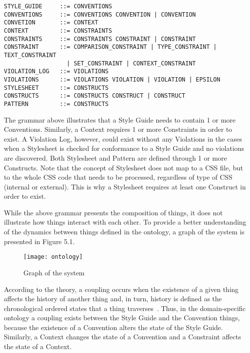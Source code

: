 \documentclass[parskip=full]{uvamscse}
\begin{document}
\begin{snippet}
\begin{verbatim}
STYLE_GUIDE     ::= CONVENTIONS
CONVENTIONS     ::= CONVENTIONS CONVENTION | CONVENTION 
CONVETION       ::= CONTEXT
CONTEXT         ::= CONSTRAINTS
CONSTRAINTS     ::= CONSTRAINTS CONSTRAINT | CONSTRAINT
CONSTRAINT      ::= COMPARISON_CONSTRAINT | TYPE_CONSTRAINT | TEXT_CONSTRAINT 
                  | SET_CONSTRAINT | CONTEXT_CONSTRAINT 
VIOLATION_LOG   ::= VIOLATIONS
VIOLATIONS      ::= VIOLATIONS VIOLATION | VIOLATION | EPSILON
STYLESHEET      ::= CONSTRUCTS
CONSTRUCTS      ::= CONSTRUCTS CONSTRUCT | CONSTRUCT
PATTERN         ::= CONSTRUCTS
\end{verbatim}
\end{snippet}

The grammar above illustrates that a Style Guide needs to contain 1 or more Conventions. Similarly,
a Context requires 1 or more Constraints in order to exist. A Violation Log, however, could exist
without any Violations in the cases when a Stylesheet is checked for conformance to a Style Guide
and no violations are discovered. Both Stylesheet and Pattern are defined through 1 or more
Constructs. Note that the concept of Stylesheet does not map to a CSS file, but to the whole CSS
code that needs to be processed, regardless of type of CSS (internal or external). This is why a
Stylesheet requires at least one Construct in order to exist.

While the above grammar presents the composition of things, it does not illustrate how things
interact with each other. To provide a better understanding of the dynamics between things defined
in the ontology, a graph of the system is presented in Figure 5.1.

\begin{figure}[h!]
  \centering
  \caption{Graph of the system}
  \texttt{[image: ontology]}
\end{figure}

According to the theory, a coupling occurs when the existence of a given thing affects the history
of another thing and, in turn, history is defined as the chronological ordered states that a thing
traverses~\cite{wand1990ontological}. Thus, in the domain-specific ontology a coupling exists
between the Style Guide and the Convention things, because the existence of a Convention alters the
state of the Style Guide. Similarly, a Context changes the state of a Convention and a Constraint
affects the state of a Context.
\end{document}

